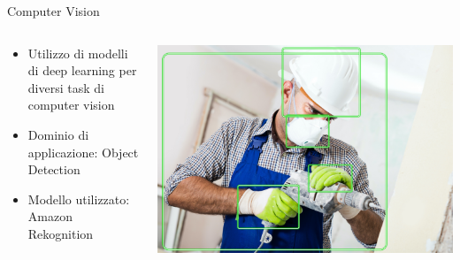\documentclass{beamer}
\begin{document}
\begin{frame}{Computer Vision}
  \begin{columns}[T,onlytextwidth]
    \begin{column}{0.55\textwidth}
      \begin{itemize}
      	\vspace{0.5cm}        
        \item Utilizzo di modelli di deep learning per diversi task di computer vision
        \vspace{0.3cm}
        \item Dominio di applicazione: Object Detection
        \vspace{0.3cm}
        \item Modello utilizzato: Amazon Rekognition      
      \end{itemize}
    \end{column}

    \begin{column}{0.4\textwidth}
      \centering
      \includegraphics[width=\textwidth]{images/worker-with-bb.png}
    \end{column}
  \end{columns}
\end{frame}
\end{document}
